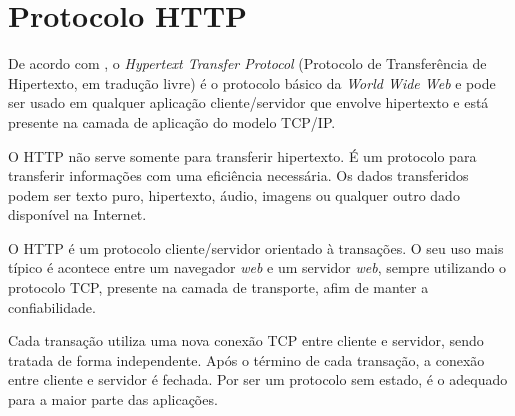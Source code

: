 \section{Protocolo HTTP}

De acordo com , o \textit{Hypertext Transfer 
Protocol} (Protocolo de Transferência de Hipertexto, em tradução livre) é o 
protocolo básico da \textit{World Wide Web} e pode ser usado em qualquer 
aplicação cliente/servidor que envolve hipertexto e está presente na camada de 
aplicação do modelo TCP/IP.

O HTTP não serve somente para transferir hipertexto. É um protocolo para 
transferir informações com uma eficiência necessária. Os dados transferidos 
podem ser texto puro, hipertexto, áudio, imagens ou qualquer outro dado 
disponível na Internet.

O HTTP é um protocolo cliente/servidor orientado à transações. O seu uso 
mais típico é acontece entre um navegador \textit{web} e um servidor 
\textit{web}, sempre utilizando o protocolo TCP, presente na camada de 
transporte, afim de manter a confiabilidade.

Cada transação utiliza uma nova conexão TCP entre cliente e servidor, sendo 
tratada de forma independente. Após o término de cada transação, a conexão 
entre cliente e servidor é fechada. Por ser um protocolo sem estado, é o 
adequado para a maior parte das aplicações.
